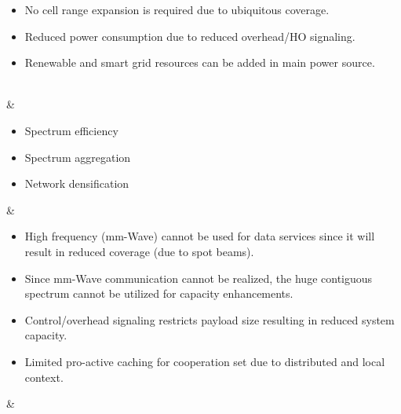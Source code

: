\documentclass[article,10pt,twocolumn]{IEEEtran}
\begin{document}
\begin{table*}[!htb]
\begin{tcolorbox}[tab3,tabularx={>{\raggedright\arraybackslash}p{0.6in}||>{\raggedright\arraybackslash}p{1.3in}||X||X}]
\begin{itemize}[leftmargin=1.25em]
																																										\item No cell range expansion is required due to ubiquitous coverage.
																																										\item Reduced power consumption due to reduced overhead/HO signaling.
																																										\item Renewable and smart grid resources can be added in main power source.
																																										\vspace*{-\baselineskip}
																																									\end{itemize} 						\\ \hline
{} 
											& \compress \begin{itemize}[leftmargin=1.25em]
												\renewcommand{\labelitemi}{$\Rightarrow$}
												\vspace*{15mm} 
												\item Spectrum efficiency
												\item Spectrum aggregation 
												\item Network densification 
												\vspace*{-\baselineskip} 
											\end{itemize} 																		
																					&\compress\begin{itemize}[leftmargin=1.25em]
																						\renewcommand{\labelitemi}{$\Rightarrow$}
																						\item High frequency (mm-Wave) cannot be used for data services since it will result in reduced coverage (due to spot beams).
																						\item Since mm-Wave communication cannot be realized, the huge contiguous spectrum cannot be utilized for capacity enhancements.
																						\item Control/overhead signaling restricts payload size resulting in reduced system capacity.
																						\item Limited pro-active caching for cooperation set due to distributed and local context.
																						\vspace*{-\baselineskip} 
																					\end{itemize}														
																																									& \compress\begin{itemize}[leftmargin=1.25em]
																																										\renewcommand{\labelitemi}{$\Rightarrow$}

\end{itemize}
\end{tcolorbox}
\end{table*}
\end{document}
